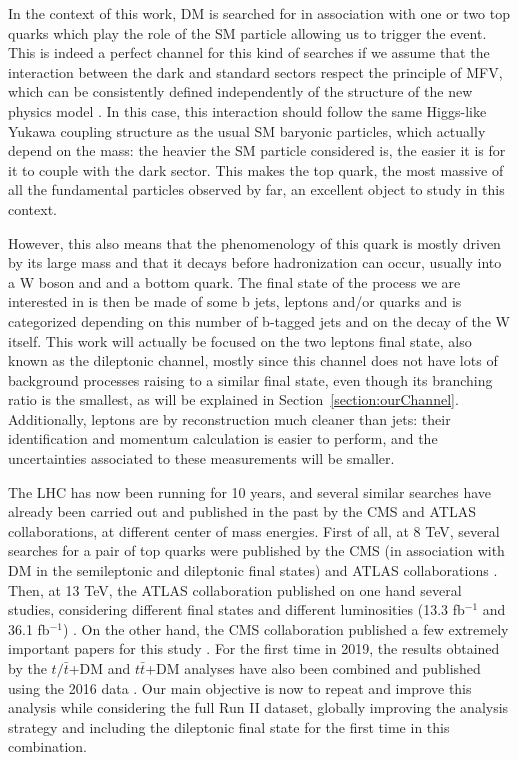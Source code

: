 \documentclass[a4paper, 10pt, openright]{report}
\begin{document}
In the context of this work, \ac{DM} is searched for in association with one or two top quarks which play the role of the \ac{SM} particle allowing us to trigger the event. This is indeed a perfect channel for this kind of searches if we assume that the interaction between the dark and standard sectors respect the principle of \ac{MFV}, which can be consistently defined independently of the structure of the new physics model \cite{MFVYukawa}. In this case, this interaction should follow the same Higgs-like Yukawa coupling structure as the usual \ac{SM} baryonic particles, which actually depend on the mass: the heavier the \ac{SM} particle considered is, the easier it is for it to couple with the dark sector. This makes the top quark, the most massive of all the fundamental particles observed by far, an excellent object to study in this context.

However, this also means that the phenomenology of this quark is mostly driven by its large mass and that it decays before hadronization can occur, usually into a W boson and and a bottom quark. The final state of the process we are interested in is then be made of some b jets, leptons and/or quarks and is categorized depending on this number of b-tagged jets and on the decay of the W itself. This work will actually be focused on the two leptons final state, also known as the dileptonic channel, mostly since this channel does not have lots of background processes raising to a similar final state, even though its branching ratio is the smallest, as will be explained in Section~\ref{section:ourChannel}. Additionally, leptons are by reconstruction much cleaner than jets: their identification and momentum calculation is easier to perform, and the uncertainties associated to these measurements will be smaller.

The \ac{LHC} has now been running for 10 years, and several similar searches have already been carried out and published in the past by the \ac{CMS} and \ac{ATLAS} collaborations, at different center of mass energies. First of all, at 8 TeV, several searches for a pair of top quarks were published by the \ac{CMS} (in association with \ac{DM} in the semileptonic \cite{PreviousDoubleTopSingleLep8CMS} and dileptonic \cite{PreviousDoubleTopDiLep8CMS} final states) and \ac{ATLAS} collaborations \cite{PreviousDoubleTopAllLep8ATLAS}. Then, at 13 TeV, the \ac{ATLAS} collaboration published on one hand several studies, considering different final states and different luminosities (13.3 fb$^{-1}$ and 36.1 fb$^{-1}$) \cite{PreviousDoubleTopNoLep13ATLAS, PreviousDoubleTopOneLep13ATLAS, PreviousDoubleTopDiLep13ATLAS}. On the other hand, the \ac{CMS} collaboration published a few extremely important papers for this study \cite{PreviousDoubleTopBottomAllLep13CMS, PreviousDoubleTopAllLep13CMS}. For the first time in 2019, the results obtained by the $t/\bar t$+DM and $t \bar t$+DM analyses have also been combined and published using the 2016 data \cite{PreviousSingleDoubleTopAllLep13CMS}. Our main objective is now to repeat and improve this analysis while considering the full Run II dataset, globally improving the analysis strategy and including the dileptonic final state for the first time in this combination.
\end{document}
